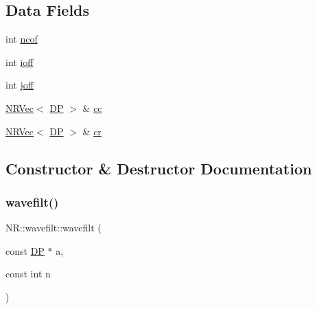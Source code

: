 \subsection*{Data Fields}
\begin{DoxyCompactItemize}
\item 
int \mbox{\hyperlink{classNR_1_1wavefilt_ae9ed314d698a843e2bbf723b2463d2e8}{ncof}}
\item 
int \mbox{\hyperlink{classNR_1_1wavefilt_acc0fda6a300680212528c1c318a3471a}{ioff}}
\item 
int \mbox{\hyperlink{classNR_1_1wavefilt_ae84da52274e02386b4a0192353ac8553}{joff}}
\item 
\mbox{\hyperlink{classNR_1_1NRVec}{N\+R\+Vec}}$<$ \mbox{\hyperlink{namespaceNR_af6ff762dd605ff477b8e52387253a02a}{DP}} $>$ \& \mbox{\hyperlink{classNR_1_1wavefilt_aa4d0e1e40a8f4ea6f18f244241cca8d1}{cc}}
\item 
\mbox{\hyperlink{classNR_1_1NRVec}{N\+R\+Vec}}$<$ \mbox{\hyperlink{namespaceNR_af6ff762dd605ff477b8e52387253a02a}{DP}} $>$ \& \mbox{\hyperlink{classNR_1_1wavefilt_a57c5c653f23d5591340255ee4fe80c3a}{cr}}
\end{DoxyCompactItemize}


\subsection{Constructor \& Destructor Documentation}
\mbox{\label{classNR_1_1wavefilt_aaa684e296af599915cdf4e0963b663c0}} 
\subsubsection{\texorpdfstring{wavefilt()}{wavefilt()}\hspace{0.1cm}{\footnotesize\ttfamily [1/3]}}
{\footnotesize\ttfamily N\+R\+::wavefilt\+::wavefilt (\begin{DoxyParamCaption}\item[{const \mbox{\hyperlink{namespaceNR_af6ff762dd605ff477b8e52387253a02a}{DP}} $\ast$}]{a,  }\item[{const int}]{n }\end{DoxyParamCaption})\hspace{0.3cm}{\ttfamily [inline]}}

\mbox{\label{classNR_1_1wavefilt_a9d223dd0fb637f3f511510b5efd9c6f6}} 
